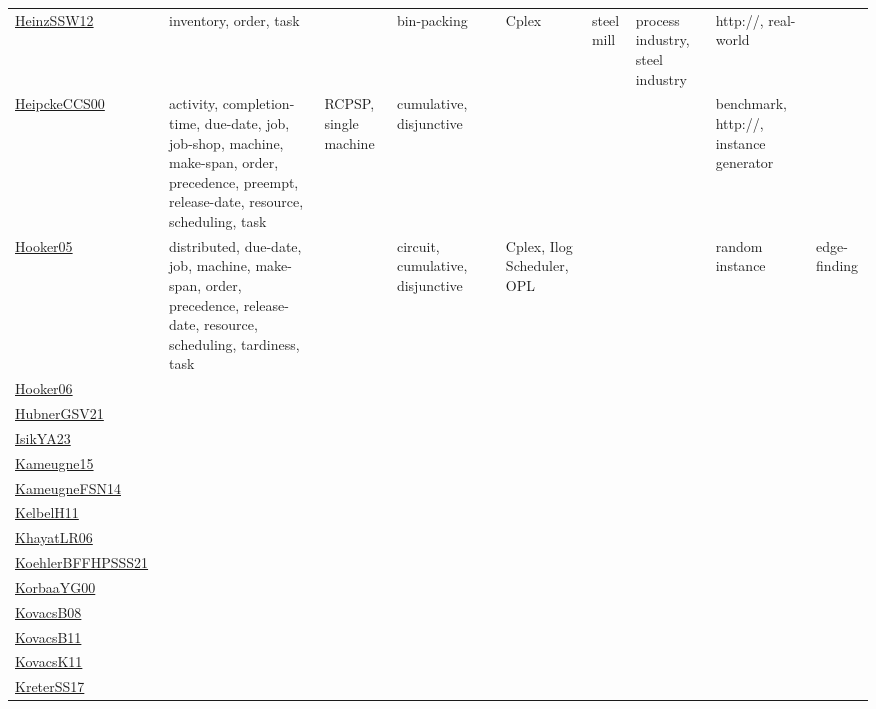 {\begin{longtable}{p{3cm}p{4cm}p{2cm}p{2cm}p{2cm}p{2cm}p{2cm}p{2cm}p{2cm}p{2cm}}
\href{articles/HeinzSSW12.pdf}{HeinzSSW12}~\cite{HeinzSSW12} & inventory, order, task &  & bin-packing &  & Cplex & steel mill & process industry, steel industry & http://, real-world & \\
\href{articles/HeipckeCCS00.pdf}{HeipckeCCS00}~\cite{HeipckeCCS00} & activity, completion-time, due-date, job, job-shop, machine, make-span, order, precedence, preempt, release-date, resource, scheduling, task & RCPSP, single machine & cumulative, disjunctive &  &  &  &  & benchmark, http://, instance generator & \\
\href{articles/Hooker05.pdf}{Hooker05}~\cite{Hooker05} & distributed, due-date, job, machine, make-span, order, precedence, release-date, resource, scheduling, tardiness, task &  & circuit, cumulative, disjunctive &  & Cplex, Ilog Scheduler, OPL &  &  & random instance & edge-finding\\
\href{articles/Hooker06.pdf}{Hooker06}~\cite{Hooker06} &  &  &  &  &  &  &  &  & \\
\href{articles/HubnerGSV21.pdf}{HubnerGSV21}~\cite{HubnerGSV21} &  &  &  &  &  &  &  &  & \\
\href{articles/IsikYA23.pdf}{IsikYA23}~\cite{IsikYA23} &  &  &  &  &  &  &  &  & \\
\href{articles/Kameugne15.pdf}{Kameugne15}~\cite{Kameugne15} &  &  &  &  &  &  &  &  & \\
\href{articles/KameugneFSN14.pdf}{KameugneFSN14}~\cite{KameugneFSN14} &  &  &  &  &  &  &  &  & \\
\href{articles/KelbelH11.pdf}{KelbelH11}~\cite{KelbelH11} &  &  &  &  &  &  &  &  & \\
\href{articles/KhayatLR06.pdf}{KhayatLR06}~\cite{KhayatLR06} &  &  &  &  &  &  &  &  & \\
\href{articles/KoehlerBFFHPSSS21.pdf}{KoehlerBFFHPSSS21}~\cite{KoehlerBFFHPSSS21} &  &  &  &  &  &  &  &  & \\
\href{articles/KorbaaYG00.pdf}{KorbaaYG00}~\cite{KorbaaYG00} &  &  &  &  &  &  &  &  & \\
\href{articles/KovacsB08.pdf}{KovacsB08}~\cite{KovacsB08} &  &  &  &  &  &  &  &  & \\
\href{articles/KovacsB11.pdf}{KovacsB11}~\cite{KovacsB11} &  &  &  &  &  &  &  &  & \\
\href{articles/KovacsK11.pdf}{KovacsK11}~\cite{KovacsK11} &  &  &  &  &  &  &  &  & \\
\href{articles/KreterSS17.pdf}{KreterSS17}~\cite{KreterSS17} &  &  &  &  &  &  &  &  & \\

\end{longtable}}
